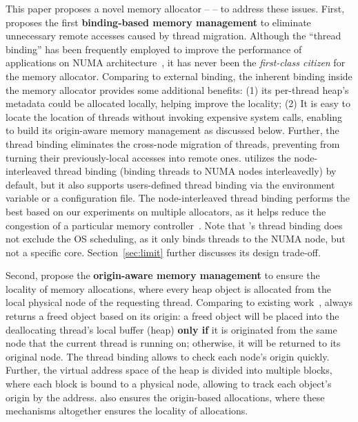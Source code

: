 This paper proposes a novel memory allocator -- \NM{} -- to address these issues.  
First, \NM{} proposes the first \textbf{binding-based memory management} to eliminate unnecessary remote accesses caused by thread migration. Although the ``thread binding'' has been frequently employed to improve the performance of applications on NUMA architecture~\cite{li2013numa, XuNuma, Lepers:2015:TMP:2813767.2813788}, it has never been the \textit{first-class citizen} for the memory allocator. Comparing to external binding, the inherent  binding inside the memory allocator provides some additional benefits: (1) its per-thread heap's metadata could be allocated locally, helping improve the locality; (2) It is easy to locate the location of threads without invoking expensive system calls, enabling \NM{} to build its origin-aware memory management as discussed below. Further, the thread binding eliminates the cross-node migration of threads, preventing from turning their previously-local accesses into remote ones. \NM{} utilizes the node-interleaved thread binding  (binding threads to NUMA nodes interleavedly) by default, but it also supports users-defined thread binding via the environment variable or a configuration file. The node-interleaved thread binding performs the best based on our experiments on multiple allocators, as it helps reduce the congestion of a particular memory controller~\cite{Blagodurov:2011:CNC:2002181.2002182}. 
Note that \NM{}'s thread binding does not exclude the OS scheduling, as it only binds threads to the NUMA node, but not a specific core. Section~\ref{sec:limit} further discusses its design trade-off.  

Second, \NM{} propose the \textbf{origin-aware memory management} to ensure the locality of memory allocations, where every heap object is allocated from the local physical node of the requesting thread. Comparing to existing work~\cite{ tcmallocnew, kim2013node, yang2019jarena, mimalloc}, \NM{} always returns a freed object based on its origin: a freed object will be placed into the deallocating thread's local buffer (heap) \textbf{only if} it is originated from the same node that the current thread is running on; otherwise, it will be returned to its original node. The thread binding allows \NM{} to check each node's origin quickly. Further,  the virtual address space of the heap is divided into multiple blocks, where each block is bound to a physical node, allowing to track each object's origin by the address. \NM{} also ensures the origin-based allocations, where these mechanisms altogether ensures the locality of allocations. 

